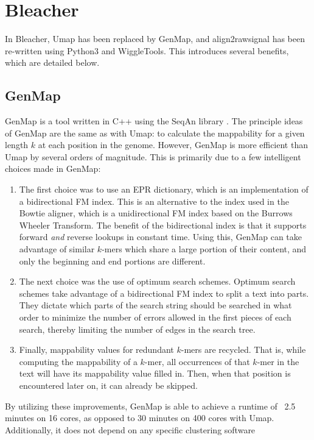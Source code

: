 \documentclass[a4paper]{article}
\begin{document}
  \section{Bleacher}
  In Bleacher, Umap has been replaced by GenMap, and align2rawsignal has been re-written using Python3 and WiggleTools.
  This introduces several benefits, which are detailed below.

    \subsection{GenMap}
    GenMap is a tool written in C++ using the SeqAn library \cite{pockrandt_genmap:_2019}. The principle ideas of GenMap are the same as with Umap:
    to calculate the mappability for a given length $k$ at each position in the genome. However, GenMap is more efficient than
    Umap by several orders of magnitude. This is primarily due to a few intelligent choices made in GenMap:
    \begin{enumerate}
      \item The first choice was to use an EPR dictionary, which is an implementation of a bidirectional FM index.
            This is an alternative to the index used in the Bowtie aligner, which is a unidirectional FM index based on
            the Burrows Wheeler Transform. The benefit of the bidirectional index is that it supports forward \textit{and}
            reverse lookups in constant time. Using this, GenMap can take advantage of similar $k$-mers which share a large
            portion of their content, and only the beginning and end portions are different.
      \item The next choice was the use of optimum search schemes. Optimum search schemes take advantage of a bidirectional
            FM index to split a text into parts. They dictate which parts of the search string should be searched in what order
            to minimize the number of errors allowed in the first pieces of each search, thereby limiting the number of edges
            in the search tree.
      \item Finally, mappability values for redundant $k$-mers are recycled. That is, while computing the mappability of
            a $k$-mer, all occurrences of that $k$-mer in the text will have its mappability value filled in. Then, when
            that position is encountered later on, it can already be skipped.
    \end{enumerate}
    By utilizing these improvements, GenMap is able to achieve a runtime of ~2.5 minutes on
    16 cores, as opposed to 30 minutes on 400 cores with Umap. Additionally, it does not depend on any specific clustering software
\end{document}
